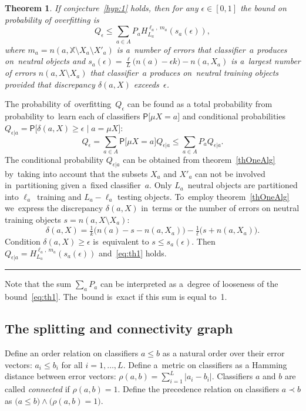 \documentclass{article} %
\def\AA{A}
\def\XX{\mathbb{X}}
\def\eps{\epsilon}
\providecommand{\Prob}{\mathsf{P}}
\def\Prbig[#1]{\Prob\bigl[#1\bigr]}
\newcommand{\hypergeom}[5]{{#1}_{#2}^{#4,\:#3}\left(#5\right)}
\newcommand{\Hyper}[4]{\hypergeom{H}{#1}{#2}{#3}{#4}}
\newtheorem{theorem}{Theorem}
\newcommand{\qed}{\hfill\rule{7pt}{7pt}}
\newenvironment{proof}{\noindent{\bf Proof:}}{\qed\medskip}
\begin{document}
\begin{theorem}
\label{th:1}
    If conjecture~\ref{hyp:1} holds, then
    for any $\eps\in[0,1]$
    the bound on probability of overfitting is
    \begin{equation}
    \label{eq:th1}
        Q_\eps
        \leq
        \sum_{a\in \AA} P_a \Hyper{L_a}{m_a}{\ell_a}{s_a(\eps)},
    \end{equation}
    where
    ${m_a = n(a,\XX{\setminus} X_a {\setminus} X'_a)}$
    is a~number of errors that classifier~$a$ produces on~neutral objects and
    ${s_a(\eps) = \tfrac\ell L \bigl( n(a)-\eps k \bigr) - n(a,X_a)}$
    is a~largest number of errors $n(a,X{\setminus}X_a)$
    that classifier~$a$ produces on~neutral training objects
    provided that discrepancy $\delta(a,X)$ exceeds~$\eps$.
\end{theorem}

\begin{proof}
    The probability of~overfitting~$Q_\eps$
    can be found as a total probability
    from probability to~learn each of classifiers $\Prbig[ \mu X\!=\!a ]$
    and conditional probabilities
    ${
        Q_{\eps|a} = \Prbig[ \delta(a,X) \!\geq\! \eps \mid a\!=\!\mu X ]
    }$:
    \[
        Q_\eps
        =
        \sum_{a\in \AA}
            \Prbig[ \mu X\!=\!a ] Q_{\eps|a}
        \leq
        \sum_{a\in \AA}
            P_a Q_{\eps|a}.
    \]
    The conditional probability $Q_{\eps|a}$ can be obtained from theorem~\ref{thOneAlg}
    by~taking into account that
    the subsets $X_a$ and $X'_a$ can not be involved in~partitioning given a~fixed classifier~$a$.
    Only $L_a$~neutral objects are partitioned
    into $\ell_a$~training and $L_a-\ell_a$ testing objects.
    To~employ theorem~\ref{thOneAlg} we~express the discrepancy $\delta(a,X)$
    in~terms or the number of errors on neutral training objects $s = n(a,X{\setminus} X_a)$:
    \[
        \delta(a,X) =
        \tfrac1k \bigl( n(a)-s-n(a,X_a) \bigr) -
        \tfrac1\ell \bigl( s+n(a,X_a) \bigr).
    \]
    Condition $\delta(a,X)\geq \eps$ is~equivalent to $s\leq s_a(\eps)$.
    Then $Q_{\eps|a} = \Hyper{L_a}{m_a}{\ell_a}{ s_a(\eps) }$
    and~\eqref{eq:th1} holds.
\end{proof}

Note that the sum $\sum_a P_a$ can be interpreted
as a~degree of looseness of the bound~\eqref{eq:th1}.
The~bound is~exact if this sum is equal to~1.


\subsection*{The splitting and connectivity graph}
Define an order relation on classifiers $a\leq b$ as a natural order over their error vectors:
$a_i \leq b_i$ for all $i=1,\ldots,L$.
Define a~metric on classifiers as a Hamming distance between error vectors:
$\rho(a,b) = \sum_{i=1}^L |a_i-b_i|$.
Classifiers $a$ and $b$ are called \emph{connected} if $\rho(a,b) = 1$.
Define the precedence relation on classifiers $a\prec b$ as
$\bigl(a\leq b\bigr) \wedge \bigl( \rho(a,b)=1 \bigr)$.
\end{document}
